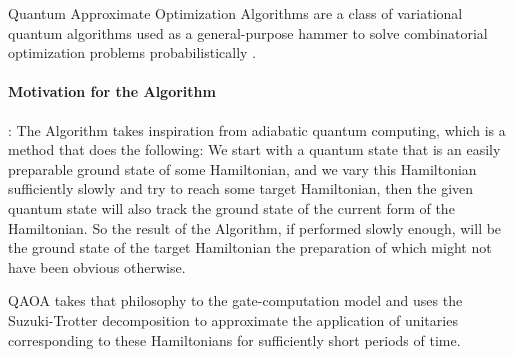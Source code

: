 Quantum Approximate Optimization Algorithms are a class of variational quantum algorithms used as a general-purpose hammer to solve combinatorial optimization problems probabilistically \cite{qaoa-max-cut-farhi}.

\paragraph*{Motivation for the Algorithm}: The Algorithm takes inspiration from adiabatic quantum computing, which is a method that does the following: We start with a quantum state that is an easily preparable ground state of some Hamiltonian, and we vary this Hamiltonian sufficiently slowly and try to reach some target Hamiltonian, then the given quantum state will also track the ground state of the current form of the Hamiltonian. So the result of the Algorithm, if performed slowly enough, will be the ground state of the target Hamiltonian the preparation of which might not have been obvious otherwise.

QAOA takes that philosophy to the gate-computation model and uses the Suzuki-Trotter \cite{method-suzuki-trotter-decomposition} decomposition to approximate the application of unitaries corresponding to these Hamiltonians for sufficiently short periods of time.

